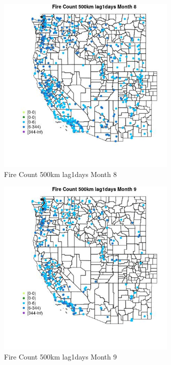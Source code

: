 \begin{figure} 
\centering  
\includegraphics[width=0.77\textwidth]{Code_Outputs/Report_ML_input_PM25_Step4_part_e_de_duplicated_aves_compiled_2019-05-18wNAs_MapObsMo8Fire_Count_500km_lag1days.jpg} 
\caption{\label{fig:Report_ML_input_PM25_Step4_part_e_de_duplicated_aves_compiled_2019-05-18wNAsMapObsMo8Fire_Count_500km_lag1days}Fire Count 500km lag1days Month 8} 
\end{figure} 
 

\begin{figure} 
\centering  
\includegraphics[width=0.77\textwidth]{Code_Outputs/Report_ML_input_PM25_Step4_part_e_de_duplicated_aves_compiled_2019-05-18wNAs_MapObsMo9Fire_Count_500km_lag1days.jpg} 
\caption{\label{fig:Report_ML_input_PM25_Step4_part_e_de_duplicated_aves_compiled_2019-05-18wNAsMapObsMo9Fire_Count_500km_lag1days}Fire Count 500km lag1days Month 9} 
\end{figure} 
 

